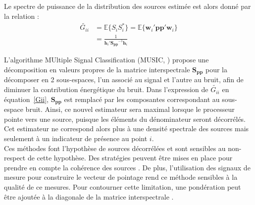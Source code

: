 Le spectre de puissance de la distribution des sources estimée est alors donné par la relation : 
\begin{align}
	\tilde{G_{ii}} &= \mathbb{E}\{S_iS_i^*\} = \mathbb{E}\{ \bm{w}_i'\bm{pp}'\bm{w}_i\}\\
	&=\frac{1}{\bm{h}_i'\bm{S_{pp}}^{-1}\bm{h}_i}\label{Gii}
\end{align}

L'algorithme MUltiple Signal Classification (MUSIC, \cite{Schmidt1986}) propose une décomposition en valeurs propres de la matrice interspectrale $\bm{S_{pp}}$ pour la décomposer en 2 sous-espaces, l’un associé au signal et l’autre au bruit, afin de diminuer la contribution énergétique du bruit.  Dans l'expression de $\tilde{G_{ii}}$ en équation~\ref{Gii}, $\bm{S_{pp}}$ est remplacé par les composantes correspondant au sous-espace bruit. Ainsi, ce nouvel estimateur sera maximal lorsque le processeur pointe vers une source, puisque les éléments du dénominateur seront décorrélés. Cet estimateur ne correspond alors plus à une densité spectrale des sources mais seulement à un indicateur de présence au point $i$.\\

Ces méthodes font l'hypothèse de sources décorrélées et sont sensibles au non-respect de cette hypothèse. Des stratégies peuvent être mises en place pour prendre en compte la cohérence des sources \citep{Jiang2003}. De plus, l'utilisation des signaux de mesure pour construire le vecteur de pointage rend ce méthode sensibles à la qualité de ce mesures. Pour contourner cette limitation, une pondération peut être ajoutée à la diagonale de la matrice interspectrale \citep{Li2003}.\\

